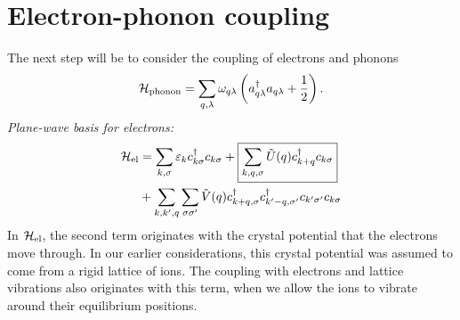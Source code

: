 \section{Electron-phonon coupling}

The next step will be to consider the coupling of electrons and phonons
\begin{equation}
	\mathcal{H}_{\text{phonon}} = \sum_{q, \lambda}\omega_{q\lambda}\left (a_{q\lambda}^{\dagger}a_{q\lambda} + \frac{1}{2}\right ).
\end{equation}
\emph{Plane-wave basis for electrons:}
\begin{align}
	\mathcal{H}_{\text{el}} &= \sum_{k,\sigma}\varepsilon_kc^{\dagger}_{k\sigma}c_{k\sigma} + \boxed{\sum_{k,q,\sigma}\tilde{U}(q)c^{\dagger}_{k+q}c_{k\sigma}} \nonumber\\
	&+\sum_{k,k',q}\sum_{\sigma\sigma'}\tilde{V}(q)c^{\dagger}_{k+q,\sigma}c^{\dagger}_{k'-q,\sigma'}c_{k'\sigma'}c_{k\sigma}
\end{align}
In $\mathcal{H}_{\text{el}}$, the second term originates with the crystal potential that the electrons move through. In our earlier considerations, this crystal potential was assumed to come from a rigid lattice of ions. The coupling with electrons and lattice vibrations also originates with this term, when we allow the ions to vibrate around their equilibrium positions. 

